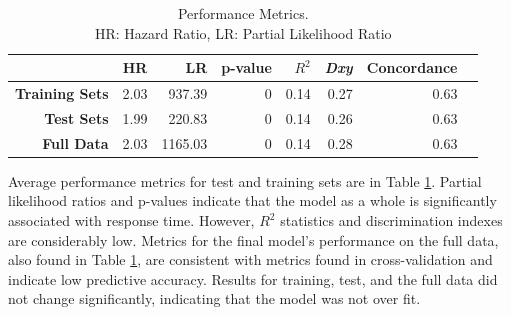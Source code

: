 \documentclass{article}
\begin{document}
\begin{table}[!htbp]
\centering
\begin{tabular}{| r | r | r | r | r  | r | r | r |}
  \hline
 & \textbf{HR} & \textbf{LR} & \textbf{p-value} & \textbf{$R^2$} & \textbf{\textit{Dxy}} & \textbf{Concordance} \\ 
  \hline
  \textbf{Training Sets} & 2.03 & 937.39 & 0 & 0.14 & 0.27 & 0.63 \\ 
  \textbf{Test Sets} & 1.99 & 220.83 & 0 & 0.14 & 0.26 & 0.63 \\
  \textbf{Full Data} & 2.03 & 1165.03 & 0 & 0.14 & 0.28 & 0.63 \\ 
   \hline
\end{tabular}
\caption{Performance Metrics. \\ HR: Hazard Ratio, LR: Partial Likelihood Ratio} 
\label{table:cv}
\end{table}

Average performance metrics for test and training sets are in Table \ref{table:cv}. Partial likelihood ratios and p-values indicate that the model as a whole is significantly associated with response time. However, $R^2$ statistics and discrimination indexes are considerably low. Metrics for the final model's performance on the full data, also found in Table \ref{table:cv}, are consistent with metrics found in cross-validation and indicate low predictive accuracy. Results for training, test, and the full data did not change significantly, indicating that the model was not over fit. 
\end{document}
